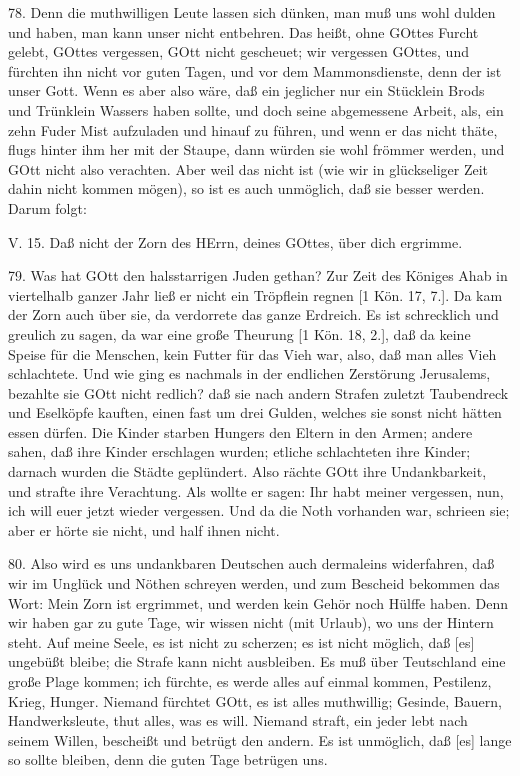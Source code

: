 78. Denn die muthwilligen Leute lassen sich dünken, man muß uns wohl dulden und haben, man kann unser nicht entbehren. Das heißt, ohne GOttes Furcht gelebt, GOttes vergessen, GOtt nicht gescheuet; wir vergessen GOttes, und fürchten ihn nicht vor guten Tagen, und vor dem Mammonsdienste, denn der ist unser Gott. Wenn es aber also wäre, daß ein jeglicher nur ein Stücklein Brods und Trünklein Wassers haben sollte, und doch seine abgemessene Arbeit, als, ein zehn Fuder Mist aufzuladen und hinauf zu führen, und wenn er das nicht thäte, flugs hinter ihm her mit der Staupe, dann würden sie wohl frömmer werden, und GOtt nicht also
verachten. Aber weil das nicht ist (wie wir in glückseliger Zeit dahin nicht kommen mögen), so ist es auch unmöglich, daß sie besser werden. Darum folgt:

\begin{schriftzitat}
V. 15. Daß nicht der Zorn des HErrn, deines GOttes, über dich ergrimme.
\end{schriftzitat}

79. Was hat GOtt den halsstarrigen Juden gethan? Zur Zeit des Königes Ahab in viertelhalb ganzer Jahr ließ er nicht ein Tröpflein regnen [1 Kön. 17, 7.]. Da kam der Zorn auch über sie, da verdorrete das ganze Erdreich. Es ist schrecklich und greulich zu sagen, da war eine große Theurung [1 Kön. 18, 2.], daß da keine Speise für die Menschen, kein Futter für das Vieh war, also, daß man alles Vieh schlachtete. Und wie ging es nachmals in der endlichen Zerstörung Jerusalems, bezahlte sie GOtt nicht redlich? daß sie nach andern Strafen zuletzt Taubendreck und Eselköpfe kauften, einen fast um drei Gulden, welches sie sonst nicht hätten essen dürfen. Die Kinder starben Hungers den Eltern in den Armen; andere sahen, daß ihre Kinder erschlagen wurden; etliche schlachteten ihre Kinder; darnach wurden die Städte geplündert. Also rächte GOtt ihre Undankbarkeit, und strafte ihre Verachtung. Als wollte er sagen: Ihr habt meiner vergessen, nun, ich will euer jetzt wieder vergessen. Und da die Noth vorhanden war, schrieen sie; aber er hörte sie nicht, und half ihnen nicht.

80. Also wird es uns undankbaren Deutschen auch dermaleins widerfahren, daß wir im Unglück und Nöthen schreyen werden, und zum Bescheid bekommen das Wort: Mein Zorn ist ergrimmet, und werden kein Gehör noch Hülffe haben. Denn wir haben gar zu gute Tage, wir wissen nicht (mit Urlaub), wo uns der Hintern steht. Auf meine Seele, es ist nicht zu scherzen; es ist nicht möglich, daß [es] ungebüßt bleibe; die Strafe kann nicht ausbleiben. Es muß über Teutschland eine große Plage kommen; ich fürchte, es werde alles auf einmal kommen, Pestilenz, Krieg, Hunger. Niemand fürchtet GOtt, es ist alles muthwillig; Gesinde, Bauern, Handwerksleute, thut alles, was es will. Niemand straft, ein jeder lebt nach seinem Willen, bescheißt und betrügt den andern. Es ist unmöglich, daß [es] lange so sollte bleiben, denn die guten Tage betrügen uns.

